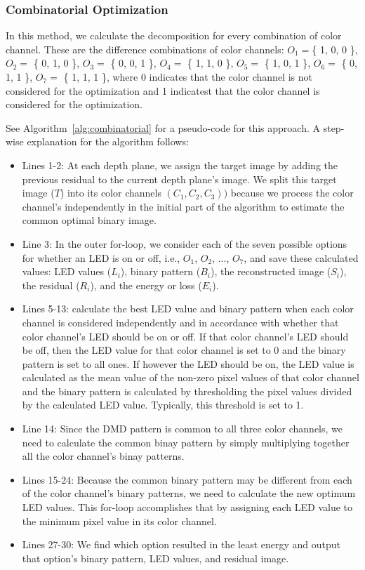 \subsubsection{Combinatorial Optimization}
\label{sec:acd:combinatorial}
In this method, we calculate the decomposition for every combination of color channel. 
These are the difference combinations of color channels: $O_1 = $\{ 1, 0, 0 \}, $O_2 = $ \{ 0, 1, 0 \}, $O_3 = $ \{ 0, 0, 1 \}, $O_4 = $ \{ 1, 1, 0 \}, $O_5 = $ \{ 1, 0, 1 \}, $O_6 = $ \{ 0, 1, 1 \}, $O_7 = $ \{ 1, 1, 1 \}, where 0 indicates that the color channel is not considered for the optimization and 1 indicatest that the color channel is considered for the optimization. 

See Algorithm~\ref{alg:combinatorial} for a pseudo-code for this approach. A step-wise explanation for the algorithm follows:
\begin{itemize}
    \item Lines 1-2: At each depth plane, we assign the target image by adding the previous residual to the current depth plane's image. We split this target image ($T$) into its color channels $(C_1, C_2, C_3))$ because we process the color channel's independently in the initial part of the algorithm to estimate the common optimal binary image.
    \item Line 3: In the outer for-loop, we consider each of the seven possible options for whether an LED is on or off, i.e., $O_1$, $O_2$, ..., $O_7$, and save these calculated values: LED values ($L_i$), binary pattern ($B_i$), the reconstructed image ($S_i$), the residual ($R_i$), and the energy or loss ($E_i$).
    \item Lines 5-13: calculate the best LED value and binary pattern when each color channel is considered independently and in accordance with whether that color channel's LED should be on or off. If that color channel's LED should be off, then the LED value for that color channel is set to 0 and the binary pattern is set to all ones. If however the LED should be on, the LED value is calculated as the mean value of the non-zero pixel values of that color channel and the binary pattern is calculated by thresholding the pixel values divided by the calculated LED value. Typically, this threshold is set to 1.
    \item Line 14: Since the DMD pattern is common to all three color channels, we need to calculate the common binay pattern by simply multiplying together all the color channel's binay patterns. 
    \item Lines 15-24: Because the common binary pattern may be different from each of the color channel's binary patterns, we need to calculate the new optimum LED values. This for-loop accomplishes that by assigning each LED value to the minimum pixel value in its color channel.
    \item Lines 27-30: We find which option resulted in the least energy and output that option's binary pattern, LED values, and residual image. 
\end{itemize}

